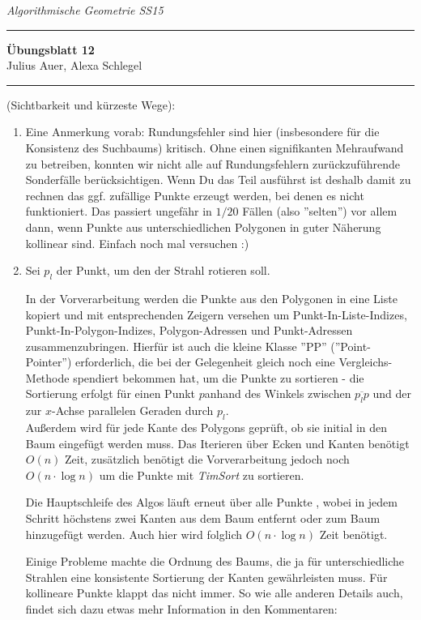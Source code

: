 \documentclass[a4paper, titlepage=false, parskip=full-, 10pt]{scrartcl}
\newcounter{tasknbr}
\newenvironment{task}[1]{{\bf Aufgabe \arabic {tasknbr}\stepcounter{tasknbr}} (#1):\begin{enumerate}}{\end{enumerate}}
\newcommand{\subtask}[1]{\item[#1)]}
\newcommand{\lecture}{Algorithmische Geometrie SS15}
\newcommand{\tutor}{}
\newcommand{\assignmentnbr}{12}
\newcommand{\students}{Julius Auer, Alexa Schlegel}
\begin{document}
  
{\small \textsl{\lecture \hfill \tutor}}
\hrule
\begin{center}
\textbf{Übungsblatt \assignmentnbr}\\
[\bigskipamount]
{\small \students}
\end{center}
\hrule

\begin{task}{Sichtbarkeit und kürzeste Wege}
\item[]
Eine Anmerkung vorab: Rundungsfehler sind hier (insbesondere für die Konsistenz des Suchbaums) kritisch. Ohne einen signifikanten Mehraufwand zu betreiben, konnten wir nicht alle auf Rundungsfehlern zurückzuführende Sonderfälle berücksichtigen. Wenn Du das Teil ausführst  ist deshalb damit zu rechnen das ggf. zufällige Punkte erzeugt werden, bei denen es nicht funktioniert. Das passiert ungefähr in $1/20$ Fällen (also ''selten'') vor allem dann, wenn Punkte aus unterschiedlichen Polygonen in guter Näherung kollinear sind. Einfach noch mal versuchen :)

\subtask{a}
Sei $p_l$ der Punkt, um den der Strahl rotieren soll.

In der Vorverarbeitung werden die Punkte aus den Polygonen in eine Liste kopiert und mit entsprechenden Zeigern versehen um Punkt-In-Liste-Indizes, Punkt-In-Polygon-Indizes, Polygon-Adressen und Punkt-Adressen zusammenzubringen. Hierfür ist auch die kleine Klasse ''PP'' (''Point-Pointer'') erforderlich, die bei der Gelegenheit gleich noch eine Vergleichs-Methode spendiert bekommen hat, um die Punkte zu sortieren - die Sortierung erfolgt für einen Punkt $p$anhand des Winkels zwischen $\overline{p_lp}$ und der zur $x$-Achse parallelen Geraden durch $p_l$.\\
Außerdem wird für jede Kante des Polygons geprüft, ob sie initial in den Baum eingefügt werden muss. Das Iterieren über Ecken und Kanten benötigt $O(n)$ Zeit, zusätzlich benötigt die Vorverarbeitung jedoch noch $O(n\cdot\log n)$ um die Punkte mit \emph{TimSort} zu sortieren.

Die Hauptschleife des Algos läuft erneut über alle Punkte , wobei in jedem Schritt höchstens zwei Kanten aus dem Baum entfernt oder zum Baum hinzugefügt werden. Auch hier wird folglich $O(n\cdot\log n)$ Zeit benötigt.

Einige Probleme machte die Ordnung des Baums, die ja für unterschiedliche Strahlen eine konsistente Sortierung der Kanten gewährleisten muss. Für kollineare Punkte klappt das nicht immer. So wie alle anderen Details auch, findet sich dazu etwas mehr Information in den Kommentaren:


\end{task}
\end{document}
